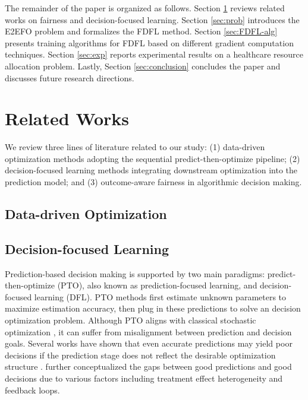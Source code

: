 \documentclass[ijoc,sglanonrev]{informs4}
\begin{document}
The remainder of the paper is organized as follows. Section \ref{sec:literature} reviews related works on fairness and decision-focused learning. Section \ref{sec:prob} introduces the E2EFO problem and formalizes the FDFL method. Section \ref{sec:FDFL-alg} presents training algorithms for FDFL based on different gradient computation techniques. Section \ref{sec:exp} reports experimental results on a healthcare resource allocation problem. Lastly, Section \ref{sec:conclusion} concludes the paper and discusses future research directions.

\section{Related Works} \label{sec:literature}
We review three lines of literature related to our study: (1) data-driven optimization methods adopting the sequential predict-then-optimize pipeline; (2) decision-focused learning methods integrating downstream optimization into the prediction model; and (3) outcome-aware fairness in algorithmic decision making. 

\subsection{Data-driven Optimization}

\subsection{Decision-focused Learning}
Prediction-based decision making is supported by two main paradigms: predict-then-optimize (PTO), also known as prediction-focused learning, and decision-focused learning (DFL). PTO methods first estimate unknown parameters to maximize estimation accuracy, then plug in these predictions to solve an decision optimization problem. Although PTO aligns with classical stochastic optimization \citep{bertsimas2020predictive}, it can suffer from misalignment between prediction and decision goals. Several works have shown that even accurate predictions may yield poor decisions if the prediction stage does not reflect the desirable optimization structure \citep{donti2017task, spo2020, wilder2019melding, qi2022integrating}. \citet{wang2024} further conceptualized the gaps between good predictions and good decisions due to various factors including treatment effect heterogeneity and feedback loops.  
\end{document}
